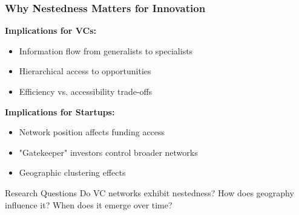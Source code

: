\begin{frame}
\frametitle{Why Nestedness Matters for Innovation}

\textbf{Implications for VCs:}
\begin{itemize}
    \item Information flow from generalists to specialists
    \item Hierarchical access to opportunities
    \item Efficiency vs. accessibility trade-offs
\end{itemize}

\vspace{0.3cm}

\textbf{Implications for Startups:}
\begin{itemize}
    \item Network position affects funding access
    \item "Gatekeeper" investors control broader networks
    \item Geographic clustering effects
\end{itemize}

\begin{alertblock}{Research Questions}
Do VC networks exhibit nestedness? How does geography influence it? When does it emerge over time?
\end{alertblock}

\end{frame}
